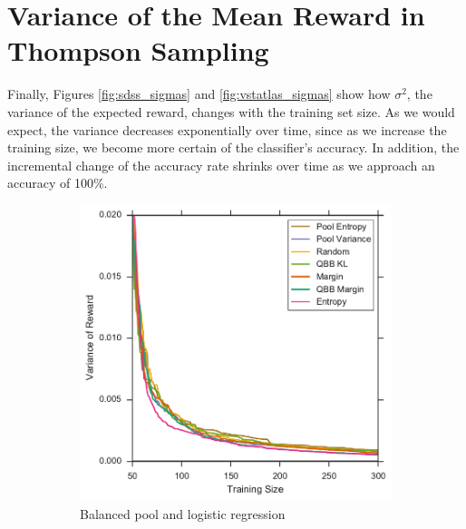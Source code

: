 \section{Variance of the Mean Reward in Thompson Sampling}

Finally, Figures \ref{fig:sdss_sigmas} and \ref{fig:vstatlas_sigmas} show how $\sigma^2$,
the variance of the expected reward, changes with the training set size. As we would expect,
the variance decreases exponentially over time, since as we increase
the training size, we become more certain of the classifier's accuracy. In addition, the incremental change
of the accuracy rate shrinks over time as we approach an accuracy of 100\%.

\begin{figure}[p]
	\centering
	\begin{subfigure}{.5\textwidth}
		\centering
		\includegraphics[width=\textwidth]{figures/5_thompson/vstatlas_bl_sigmas}
		\caption{Balanced pool and logistic regression}
		\label{fig:sdss_bl_sigmas}
	\end{subfigure}%
	\begin{subfigure}{.5\textwidth}
		\centering

\end{subfigure}
\end{figure}

